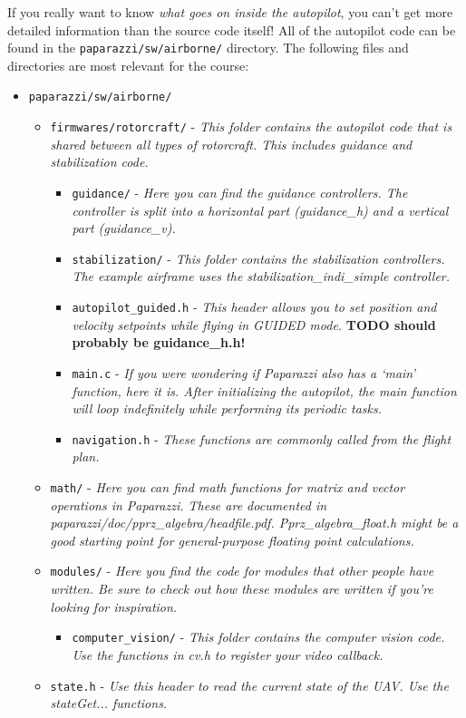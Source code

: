 \documentclass{article}
\begin{document}
If you really want to know \emph{what goes on inside the autopilot}, you can't get more detailed information than the source code itself! All of the autopilot code can be found in the \texttt{paparazzi/sw/airborne/} directory. The following files and directories are most relevant for the course:
\begin{itemize}
\item \texttt{paparazzi/sw/airborne/}
\begin{itemize}
\item \texttt{firmwares/rotorcraft/} - \emph{This folder contains the autopilot code that is shared between all types of rotorcraft. This includes guidance and stabilization code.}
\begin{itemize}
\item \texttt{guidance/} - \emph{Here you can find the guidance controllers. The controller is split into a horizontal part (guidance\_h) and a vertical part (guidance\_v).}
\item \texttt{stabilization/} - \emph{This folder contains the stabilization controllers. The example airframe uses the stabilization\_indi\_simple controller.}
\item \texttt{autopilot\_guided.h} - \emph{This header allows you to set position and velocity setpoints while flying in GUIDED mode.} \textbf{TODO should probably be guidance\_h.h!}
\item \texttt{main.c} - \emph{If you were wondering if Paparazzi also has a `main' function, here it is. After initializing the autopilot, the main function will loop indefinitely while performing its periodic tasks.}
\item \texttt{navigation.h} - \emph{These functions are commonly called from the flight plan.}
\end{itemize}
\item \texttt{math/} - \emph{Here you can find math functions for matrix and vector operations in Paparazzi. These are documented in paparazzi/doc/pprz\_algebra/headfile.pdf. Pprz\_algebra\_float.h might be a good starting point for general-purpose floating point calculations.}
\item \texttt{modules/} - \emph{Here you find the code for modules that other people have written. Be sure to check out how these modules are written if you're looking for inspiration.}
\begin{itemize}
\item \texttt{computer\_vision/} - \emph{This folder contains the computer vision code. Use the functions in cv.h to register your video callback.}
\end{itemize}
\item \texttt{state.h} - \emph{Use this header to read the current state of the UAV. Use the stateGet... functions.}
\end{itemize}
\end{itemize}
\end{document}
